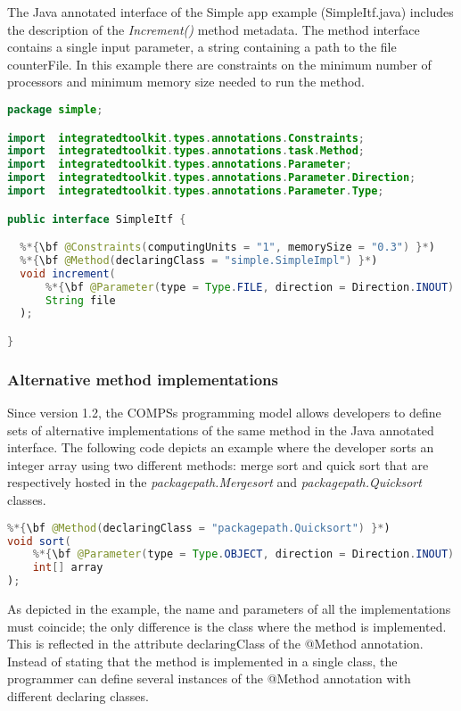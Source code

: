     
The Java annotated interface of the Simple app example (SimpleItf.java) includes the description of the {\it Increment()} method metadata.
The method interface contains a single input parameter, a string containing a path to the file counterFile. In this example
there are constraints on the minimum number of processors and minimum memory size needed to run the
method.

\begin{lstlisting}[language=java]
package simple;

import  integratedtoolkit.types.annotations.Constraints;
import  integratedtoolkit.types.annotations.task.Method;
import  integratedtoolkit.types.annotations.Parameter;
import  integratedtoolkit.types.annotations.Parameter.Direction;
import  integratedtoolkit.types.annotations.Parameter.Type;

public interface SimpleItf {

  %*{\bf @Constraints(computingUnits = "1", memorySize = "0.3") }*)
  %*{\bf @Method(declaringClass = "simple.SimpleImpl") }*)
  void increment(
      %*{\bf @Parameter(type = Type.FILE, direction = Direction.INOUT) }*)
      String file
  );

}
\end{lstlisting}


\subsubsection{Alternative method implementations}
Since version 1.2, the COMPSs programming model allows developers to define sets of alternative implementations of the same method in 
the Java annotated interface. 
The following code depicts an example where the developer sorts an integer array using two different
methods: merge sort and quick sort that are respectively hosted in the {\it packagepath.Mergesort} and
{\it packagepath.Quicksort} classes.

\begin{lstlisting}[language=java]
%*{\bf @Method(declaringClass = "packagepath.Mergesort") }*)
%*{\bf @Method(declaringClass = "packagepath.Quicksort") }*)                       
void sort(
    %*{\bf @Parameter(type = Type.OBJECT, direction = Direction.INOUT) }*)
    int[] array
);
\end{lstlisting}

As depicted in the example, the name and parameters of all the implementations must coincide; the only
difference is the class where the method is implemented. This is reflected in the attribute declaringClass of
the @Method annotation. Instead of stating that the method is implemented in a single class, the
programmer can define several instances of the @Method annotation with different declaring classes.

